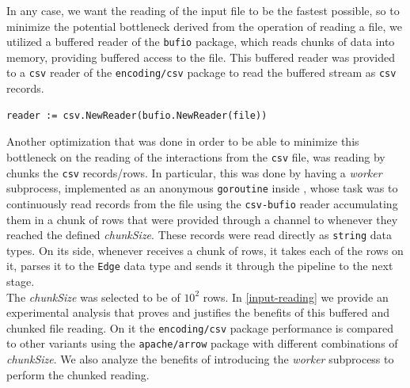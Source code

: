 In any case, we want the reading of the input file to be the fastest possible, so to minimize the potential bottleneck derived from the operation of reading a file, we utilized a buffered reader of the \texttt{bufio} package, which reads chunks of data into memory, providing buffered access to the file. This buffered reader was provided to a \texttt{csv} reader of the \texttt{encoding/csv} package to read the buffered stream as \texttt{csv} records.

    \begin{center}
    \lstset{style=golangStyle}
    \begin{lstlisting}[caption={\texttt{csv-bufio} reader}]
        reader := csv.NewReader(bufio.NewReader(file))
    \end{lstlisting}
    \end{center}
    
Another optimization that was done in order to be able to minimize this bottleneck on the reading of the interactions from the \texttt{csv} file, was reading by chunks the \texttt{csv} records/rows. In particular, this was done by having a \textit{worker} subprocess, implemented as an anonymous \texttt{goroutine} inside \Sr, whose task was to continuously read records from the file using the \texttt{csv-bufio} reader accumulating them in a chunk of rows that were provided through a channel to \Sr whenever they reached the defined \emph{chunkSize}. These records were read directly as \texttt{string} data types. On its side, whenever \Sr receives a chunk of rows, it takes each of the rows on it, parses it to the \texttt{Edge} data type and sends it through the pipeline to the next stage.\\

The \emph{chunkSize} was selected to be of $10^2$ rows. In \ref{input-reading} we provide an experimental analysis that proves and justifies the benefits of this buffered and chunked file reading. On it the \texttt{encoding/csv} package performance is compared to other variants using the \texttt{apache/arrow} package with different combinations of \emph{chunkSize}. We also analyze the benefits of introducing the \textit{worker} subprocess to perform the chunked reading.








